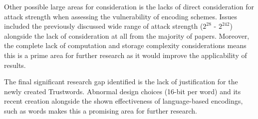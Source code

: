 Other possible large areas for consideration is the lacks of direct consideration for attack strength when assessing the vulnerability of encoding schemes. Issues included the previously discussed wide range of attack strength ($2^{28}$ - $2^{242}$) alongside the lack of consideration at all from the majority of papers. Moreover, the complete lack of computation and storage complexity considerations means this is a prime area for further research as it would improve the applicability of results.

The final significant research gap identified is the lack of justification for the newly created Trustwords. Abnormal design choices (16-bit per word) and its recent creation alongside the shown effectiveness of language-based encodings, such as words makes this a promising area for further research. 